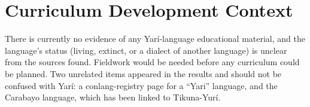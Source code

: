 \documentclass[12pt]{article}
\begin{document}
\section{Curriculum Development Context}
There is currently no evidence of any Yar\'i-language educational material, and the language's status (living, extinct, or a dialect of another language) is unclear from the sources found. Fieldwork would be needed before any curriculum could be planned. Two unrelated items appeared in the results and should not be confused with Yar\'i: a conlang-registry page for a ``Yari'' language, and the Carabayo language, which has been linked to Tikuna-Yur\'i.
\end{document}
